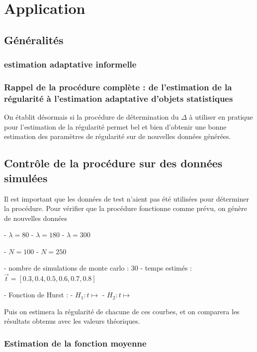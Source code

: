 \chapter{
  Application
 }
\minitoc%

\section{Généralités}

\subsection{estimation adaptative informelle}

\pagebreak

\subsection{Rappel de la procédure complète : de l'estimation de la régularité à l'estimation adaptative d'objets statistiques}

On établit désormais si la procédure de détermination du $\Delta$ à utiliser en pratique pour l'estimation de la régularité permet bel et bien d'obtenir une bonne estimation des paramètres de régularité sur de nouvelles données générées. 

\section{Contrôle de la procédure sur des données simulées}

Il est important que les données de test n'aient pas été utilisées pour déterminer la procédure. Pour vérifier que la procédure fonctionne comme prévu, on génère de nouvelles données 

- $\lambda = 80$
- $\lambda = 180$
- $\lambda = 300$

- $N = 100$
- $N=250$

- nombre de simulations de monte carlo : 30
- temps estimés : $\vec t = [0.3, 0.4, 0.5, 0.6, 0.7, 0.8]$

- Fonction de Hurst :
  - $H_1 : t \mapsto$
  - $H_2 : t \mapsto$

  Puis on estimera la régularité de chacune de ces courbes, et on comparera les résultats obtenus avec les valeurs théoriques.


\subsection{Estimation de la fonction moyenne}

